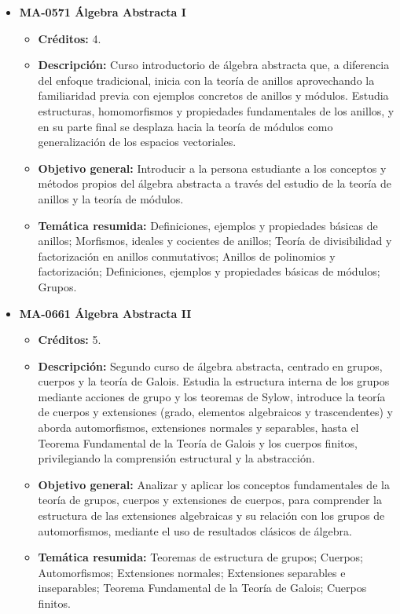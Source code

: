 \begin{itemize}[leftmargin=1.3em, itemsep=10pt, topsep=4pt, label={\color{Azul-UCR}$\blacksquare$}]
\item {\color{Azul-UCR}\textbf{MA-0571 Álgebra Abstracta I}}\par\nopagebreak\smallskip
\begin{itemize}[leftmargin=1.1em, itemsep=3pt, topsep=2pt, parsep=2pt, label={\textendash}]
\item \textbf{Créditos:} 4.
\item \textbf{Descripción:} Curso introductorio de álgebra abstracta que, a diferencia del enfoque tradicional, inicia con la teoría de anillos aprovechando la familiaridad previa con ejemplos concretos de anillos y módulos. Estudia estructuras, homomorfismos y propiedades fundamentales de los anillos, y en su parte final se desplaza hacia la teoría de módulos como generalización de los espacios vectoriales.
\item \textbf{Objetivo general:} Introducir a la persona estudiante a los conceptos y métodos propios del álgebra abstracta a través del estudio de la teoría de anillos y la teoría de módulos.
\item \textbf{Temática resumida:} Definiciones, ejemplos y propiedades básicas de anillos; Morfismos, ideales y cocientes de anillos; Teoría de divisibilidad y factorización en anillos conmutativos; Anillos de polinomios y factorización; Definiciones, ejemplos y propiedades básicas de módulos; Grupos.
\end{itemize}

\item {\color{Azul-UCR}\textbf{MA-0661 Álgebra Abstracta II}}\par\nopagebreak\smallskip
\begin{itemize}[leftmargin=1.1em, itemsep=3pt, topsep=2pt, parsep=2pt, label={\textendash}]
\item \textbf{Créditos:} 5.
\item \textbf{Descripción:} Segundo curso de álgebra abstracta, centrado en grupos, cuerpos y la teoría de Galois. Estudia la estructura interna de los grupos mediante acciones de grupo y los teoremas de Sylow, introduce la teoría de cuerpos y extensiones (grado, elementos algebraicos y trascendentes) y aborda automorfismos, extensiones normales y separables, hasta el Teorema Fundamental de la Teoría de Galois y los cuerpos finitos, privilegiando la comprensión estructural y la abstracción.
\item \textbf{Objetivo general:} Analizar y aplicar los conceptos fundamentales de la teoría de grupos, cuerpos y extensiones de cuerpos, para comprender la estructura de las extensiones algebraicas y su relación con los grupos de automorfismos, mediante el uso de resultados clásicos de álgebra.
\item \textbf{Temática resumida:} Teoremas de estructura de grupos; Cuerpos; Automorfismos; Extensiones normales; Extensiones separables e inseparables; Teorema Fundamental de la Teoría de Galois; Cuerpos finitos.
\end{itemize}


\end{itemize}

